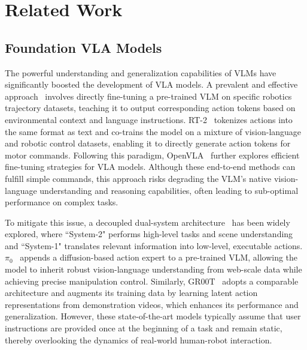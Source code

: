 \section{Related Work}
\label{sec:related}

\subsection{Foundation VLA Models}

The powerful understanding and generalization capabilities of VLMs have significantly boosted the development of VLA models. A prevalent and effective approach~\citep{rt2, openvla, octo, gr1} involves directly fine-tuning a pre-trained VLM on specific robotics trajectory datasets, teaching it to output corresponding action tokens based on environmental context and language instructions. RT-2~\citep{rt2} tokenizes actions into the same format as text and co-trains the model on a mixture of vision-language and robotic control datasets, enabling it to directly generate action tokens for motor commands. Following this paradigm, OpenVLA~\citep{openvla} further explores efficient fine-tuning strategies for VLA models. Although these end-to-end methods can fulfill simple commands, this approach risks degrading the VLM's native vision-language understanding and reasoning capabilities, often leading to sub-optimal performance on complex tasks.

To mitigate this issue, a decoupled dual-system architecture~\citep{pi0, gr00t, fstd, thinkact, fis, onetwovla} has been widely explored, where ``System-2" performs high-level tasks and scene understanding and ``System-1" translates relevant information into low-level, executable actions. $\pi_0$~\citep{pi0} appends a diffusion-based action expert to a pre-trained VLM, allowing the model to inherit robust vision-language understanding from web-scale data while achieving precise manipulation control. Similarly, GR00T~\citep{gr00t} adopts a comparable architecture and augments its training data by learning latent action representations from demonstration videos, which enhances its performance and generalization. However, these state-of-the-art models typically assume that user instructions are provided once at the beginning of a task and remain static, thereby overlooking the dynamics of real-world human-robot interaction.

